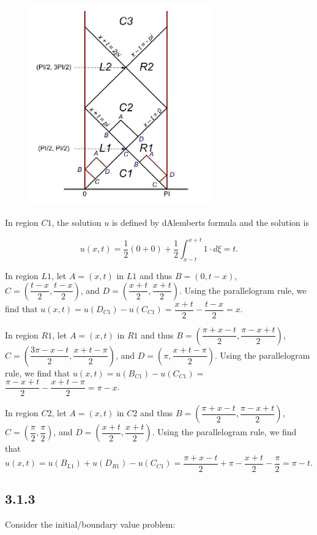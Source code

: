 \documentclass{article}
\begin{document}
\begin{figure}[h]
 \centering
  \includegraphics[width=0.7\textwidth]{Region.png}
 \end{figure}
In region $C1$, the solution $u$ is defined by d\textsc{}Alembert\textsc{}s formula and the solution is

$$u(x,t)=\frac{1}{2}(0+0)+\frac{1}{2}\int_{x-t}^{x+t}1\cdot d\xi= t.$$

In region $L1$, let $A=(x,t)$ in $L1$ and thus $B=(0,t-x)$, $C=(\dfrac{t-x}{2}, \dfrac{t-x}{2})$, and $D=(\dfrac{x+t}{2}, \dfrac{x+t}{2})$. Using the parallelogram rule, we find that $u(x,t)=u(D_{C1})-u(C_{C1})=\dfrac{x+t}{2} - \dfrac{t-x}{2}=x$.

In region $R1$, let $A=(x,t)$ in $R1$ and thus $B=(\dfrac{\pi + x -t}{2},\dfrac{\pi - x +t}{2})$, $C=(\dfrac{3\pi -x -t}{2}, \dfrac{x+t - \pi}{2})$, and $D=(\pi, \dfrac{x+t-\pi}{2})$. Using the parallelogram rule, we find that $u(x,t)=u(B_{C1})-u(C_{C1}) =$ $\dfrac{\pi-x+t}{2} - \dfrac{x+t-\pi}{2}=\pi - x$.

In region $C2$, let $A=(x,t)$ in $C2$ and thus $B=(\dfrac{\pi + x -t}{2},\dfrac{\pi - x +t}{2})$, $C=(\dfrac{\pi}{2}, \dfrac{\pi}{2})$, and $D=(\dfrac{x+t}{2}, \dfrac{x+t}{2})$. Using the parallelogram rule, we find that $u(x,t)=u(B_{L1})+u(D_{R1})-u(C_{C1})=\dfrac{\pi + x -t}{2} + \pi - \dfrac{x+t}{2} -\dfrac{\pi}{2}=\pi - t$.

\subsection{\textbf{3.1.3}} Consider the initial/boundary value problem:
\end{document}

